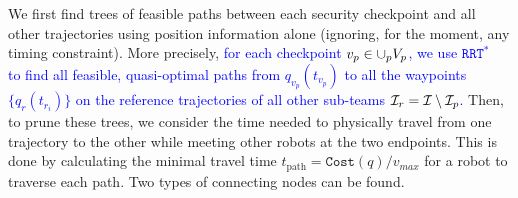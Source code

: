 \documentclass[10pt,twocolumn,twoside]{IEEEtran}
\newcommand{\rrtstar}{$\texttt{RRT}^\texttt{*}$}
\newcommand{\new}[1]{\textcolor{blue}{#1}}
\begin{document}

We first find trees of feasible paths between each security checkpoint and all other trajectories using position information alone (ignoring, for the moment, any timing constraint). 
More precisely, \new{for each checkpoint $v_p \in \cup_p V_p$, we use \rrtstar~ to find all feasible, quasi-optimal paths from $q_{v_p}(t_{v_p})$ to all the waypoints $\{q_{r}(t_{{r}_{i}})\}$ on the reference trajectories of all other sub-teams $\mathcal{I}_{r} = \mathcal{I} \setminus \mathcal{I}_{p}$.}
Then, to prune these trees, we consider the time needed to physically travel from one trajectory to the other while meeting other robots at the two endpoints. This is done by calculating the minimal travel time $t_{\textrm{path}}=\texttt{Cost}(q)/v_{max}$ for a robot to traverse each path. Two types of connecting nodes can be found.
\end{document}
